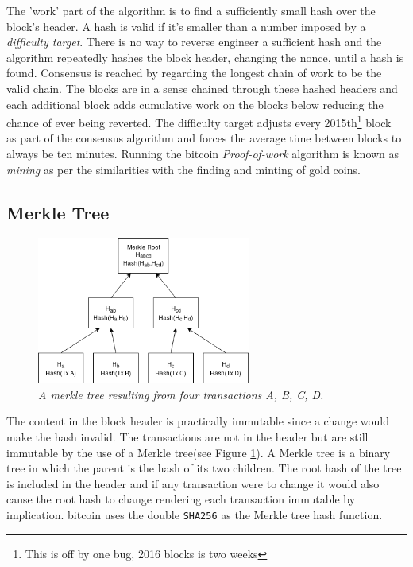 The 'work' part of the algorithm is to find a sufficiently small hash over the block's header. A hash is valid if it's smaller than a number imposed by a \textit{difficulty target}. There is no way to reverse engineer a sufficient hash and the algorithm repeatedly hashes the block header, changing the nonce, until a hash is found. Consensus is reached by regarding the longest chain of work to be the valid chain. The blocks are in a sense chained through these hashed headers and each additional block adds cumulative work on the blocks below reducing the chance of ever being reverted. The difficulty target adjusts every 2015th\footnote{This is off by one bug, 2016 blocks is two weeks} block~\cite{repository:bitcoin} as part of the consensus algorithm and forces the average time between blocks to always be ten minutes. Running the bitcoin \textit{Proof-of-work} algorithm is known as \textit{mining} as per the similarities with the finding and minting of gold coins.

\subsection{Merkle Tree}

\begin{figure}[!htb]
	
	\centering
	\includegraphics[width=7cm]{images/merkle.png}
	\caption{\textit{A merkle tree resulting from four transactions A, B, C, D.
	}}
	\label{fig:merkle:tree}
	
\end{figure}

The content in the block header is practically immutable since a change would make the \gls{hash} invalid. The transactions are not in the header but are still immutable by the use of a Merkle tree(see Figure \ref{fig:merkle:tree}). A Merkle tree is a binary tree in which the parent is the hash of its two children. The root hash of the tree is included in the header and if any transaction were to change it would also cause the root hash to change rendering each transaction immutable by implication. \gls{bitcoin} uses the double \texttt{SHA256} as the Merkle tree hash function.

